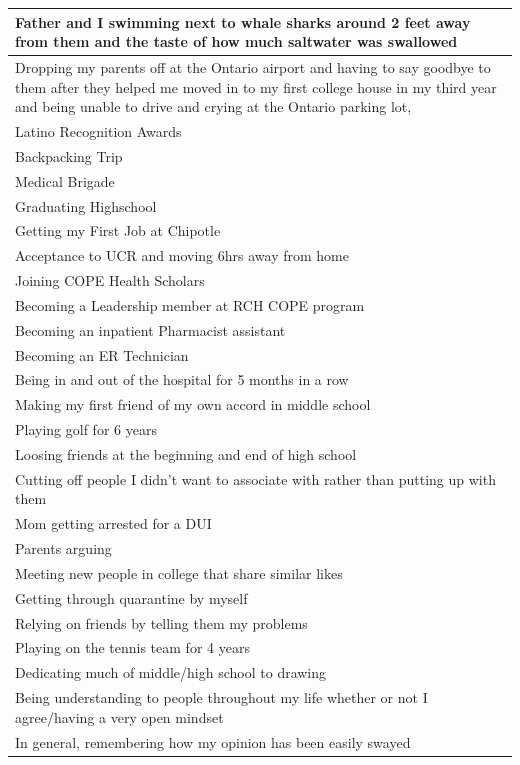 \documentclass[
  .7em,
  letterpaper,
  DIV=11,
  numbers=noendperiod]{scrartcl}
\begin{document}
\begin{table}
\begin{tabular}{l}
\hline
Father and I swimming next to whale sharks around 2 feet away from them and the taste of how much saltwater was swallowed\\
\hline
Dropping my parents off at the Ontario airport and having to say goodbye to them after they helped me moved in to my first college house in my third year and being unable to drive and crying at the Ontario parking lot,\\
\hline
Latino Recognition Awards\\
\hline
Backpacking Trip\\
\hline
Medical Brigade\\
\hline
Graduating Highschool\\
\hline
Getting my First Job at Chipotle\\
\hline
Acceptance to UCR and moving 6hrs away from home\\
\hline
Joining COPE Health Scholars\\
\hline
Becoming a Leadership member at RCH COPE program\\
\hline
Becoming an inpatient Pharmacist assistant\\
\hline
Becoming an ER Technician\\
\hline
Being in and out of the hospital for 5 months in a row\\
\hline
Making my first friend of my own accord in middle school\\
\hline
Playing golf for 6 years\\
\hline
Loosing friends at the beginning and end of high school\\
\hline
Cutting off people I didn't want to associate with rather than putting up with them\\
\hline
Mom getting arrested for a DUI\\
\hline
Parents arguing\\
\hline
Meeting new people in college that share similar likes\\
\hline
Getting through quarantine by myself\\
\hline
Relying on friends by telling them my problems\\
\hline
Playing on the tennis team for 4 years\\
\hline
Dedicating much of middle/high school to drawing\\
\hline
Being understanding to people throughout my life whether or not I agree/having a very open mindset\\
\hline
In general, remembering how my opinion has been easily swayed\\

\end{tabular}
\end{table}
\end{document}
